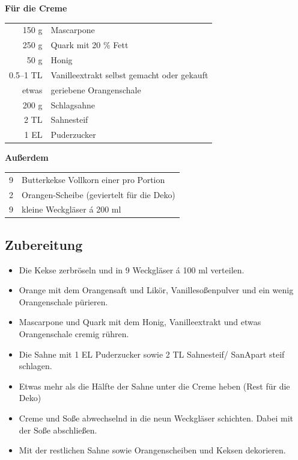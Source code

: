     \textbf{Für die Creme}\\
    \begin{tabular}{r l}
           150 g & Mascarpone                                   \\
           250 g & Quark mit 20 \% Fett                         \\
            50 g & Honig                                        \\
        0.5–1 TL & Vanilleextrakt selbst gemacht oder gekauft   \\
           etwas & geriebene Orangenschale                      \\
           200 g & Schlagsahne                                  \\
            2 TL & Sahnesteif                                   \\
            1 EL & Puderzucker                                
    \end{tabular}
    
    \textbf{Außerdem} \\
    \begin{tabular}{r l}
         9 & Butterkekse Vollkorn einer pro Portion \\
         2 & Orangen-Scheibe (geviertelt für die Deko)\\
         9 & kleine Weckgläser á 200 ml
    \end{tabular}
    
    \subsection*{Zubereitung}
    \begin{itemize}
        \item Die Kekse zerbröseln und in 9 Weckgläser á 100 ml verteilen.
        \item Orange mit dem Orangensaft und Likör, Vanillesoßenpulver und ein wenig Orangenschale pürieren.
        \item Mascarpone und Quark mit dem Honig, Vanilleextrakt und etwas Orangenschale cremig rühren.
        \item Die Sahne mit 1 EL Puderzucker sowie 2 TL Sahnesteif/ SanApart steif schlagen.
        \item Etwas mehr als die Hälfte der Sahne unter die Creme heben (Rest für die Deko)
        \item Creme und Soße abwechselnd in die neun Weckgläser schichten. Dabei mit der Soße abschließen.
        \item  Mit der restlichen Sahne sowie Orangenscheiben und Keksen dekorieren.
    \end{itemize}


